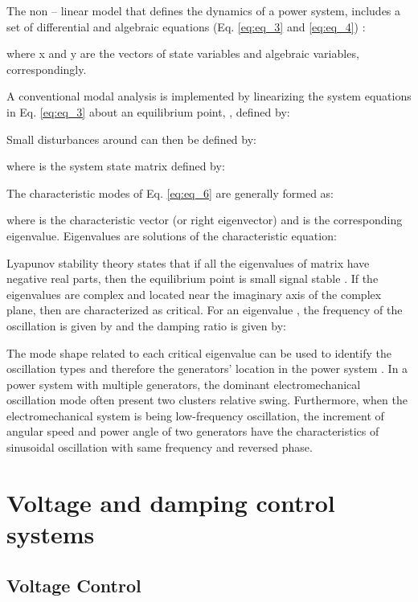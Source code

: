 \documentclass[conference,11pt]{IEEEtran}
\newcommand{\ignore}[2]{\hspace{0in}#2}
\begin{document}
The non – linear model that defines the dynamics of a power system, includes a set of differential and algebraic equations (Eq. \ref{eq:eq_3} and \ref{eq:eq_4}) \cite{ref21}: 






{\setlength{\parindent}{0cm}
where x and y are the vectors of state variables and algebraic variables, correspondingly.}

A conventional modal analysis is implemented by linearizing the system equations in Eq. \ref{eq:eq_3} about an equilibrium point, , defined by:


Small disturbances around  can then be defined by:


{\setlength{\parindent}{0cm}
where  is the system state matrix defined by:}




The characteristic modes of Eq. \ref{eq:eq_6} are generally formed as:

{\setlength{\parindent}{0cm}
where  is the characteristic vector (or right eigenvector) and  is the corresponding eigenvalue. Eigenvalues are solutions of the characteristic equation:}


Lyapunov stability theory states that if all the eigenvalues of matrix  have negative real parts, then the equilibrium point is small signal stable \cite{ref21}. If the eigenvalues are complex and located near the imaginary axis of the complex plane, then are characterized as critical. For an eigenvalue , the frequency of the oscillation is given by  and the damping ratio  is given by:


The mode shape related to each critical eigenvalue can be used to identify the oscillation types and therefore the generators' location in the power system \cite{ref21}. \ignore{, ref22} In a power system with multiple generators, the dominant electromechanical oscillation mode often present two clusters relative swing. Furthermore, when the electromechanical system is being low-frequency oscillation, the increment of angular speed and power angle of two generators have the characteristics of sinusoidal oscillation with same frequency and reversed phase. 

\section{Voltage and damping control systems}\label{s:control}

\subsection{Voltage Control}\label{ss:v_control}
\end{document}
